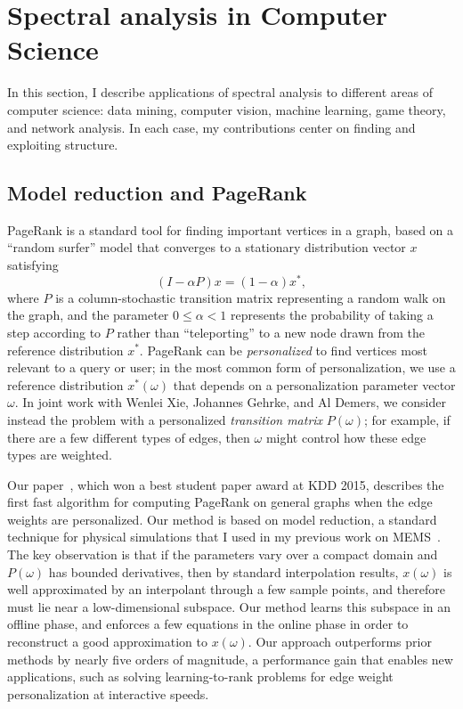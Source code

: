 \documentclass{amsart}
\begin{document}
\section{Spectral analysis in Computer Science}
\label{sec-eigen-apps}

In this section, I describe applications of spectral analysis to
different areas of computer science: data mining, computer vision,
machine learning, game theory, and network analysis. In each case, my
contributions center on finding and exploiting structure.


\subsection*{Model reduction and PageRank}

PageRank is a standard tool for finding important vertices in a graph,
based on a ``random surfer'' model that converges to
a stationary distribution vector $x$ satisfying
\[
  (I-\alpha P) x = (1-\alpha) x^*,
\]
where $P$ is a column-stochastic transition matrix representing a random
walk on the graph, and the parameter $0 \leq \alpha < 1$  represents the
probability of taking a step according to $P$ rather than
``teleporting'' to a new node drawn from the reference distribution
$x^*$.  PageRank can be {\em personalized} to find vertices
most relevant to a query or user; in the most common form of
personalization, we use a
reference distribution $x^*(\omega)$ that depends on
a personalization parameter vector $\omega$.  In joint work with Wenlei
Xie, Johannes Gehrke, and Al Demers, we consider instead the problem
with a personalized {\em transition matrix} $P(\omega)$;
for example, if there are a few different types of edges,
then $\omega$ might control how these edge types are weighted.

Our paper~\cite{2015-edgeppr}, which won a best student paper award at KDD
2015, describes the first fast algorithm for computing PageRank on
general graphs when the edge weights are personalized. Our method is
based on model reduction, a standard technique for physical simulations
that I used in my previous work on
MEMS~\cite{2001-msm,2004-para,2005-ijnme,2005-sensors}.  The
key observation is that if the parameters vary over a compact domain and
$P(\omega)$ has bounded derivatives, then by standard interpolation
results, $x(\omega)$ is well approximated by an interpolant through a
few sample points, and therefore must lie near a low-dimensional
subspace.  Our method learns this subspace in an offline phase, and
enforces a few equations in the online phase in
order to reconstruct a good approximation to $x(\omega)$.  Our approach
outperforms prior methods by nearly five orders of magnitude, a
performance gain that enables new applications, such as
solving learning-to-rank problems for edge weight personalization at
interactive speeds.
\end{document}
